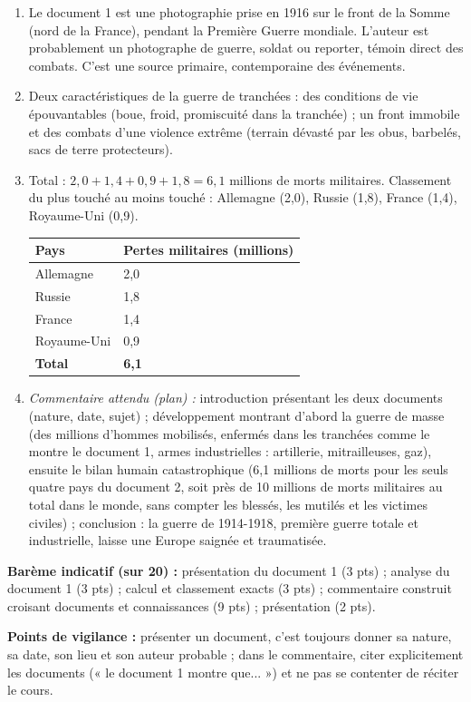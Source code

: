 \documentclass[11pt]{article}
\begin{document}
\begin{corrige}
\begin{enumerate}
\item Le document 1 est une photographie prise en 1916 sur le front de la Somme (nord de la France), pendant la Première Guerre mondiale. L'auteur est probablement un photographe de guerre, soldat ou reporter, témoin direct des combats. C'est une source primaire, contemporaine des événements.
\item Deux caractéristiques de la guerre de tranchées : des conditions de vie épouvantables (boue, froid, promiscuité dans la tranchée) ; un front immobile et des combats d'une violence extrême (terrain dévasté par les obus, barbelés, sacs de terre protecteurs).
\item Total : $2{,}0 + 1{,}4 + 0{,}9 + 1{,}8 = 6{,}1$ millions de morts militaires. Classement du plus touché au moins touché : Allemagne (2,0), Russie (1,8), France (1,4), Royaume-Uni (0,9).

\begin{center}
\begin{tabularx}{\linewidth}{|l|X|}\hline
\textbf{Pays} & \textbf{Pertes militaires (millions)} \\ \hline
Allemagne & 2,0 \\ \hline
Russie & 1,8 \\ \hline
France & 1,4 \\ \hline
Royaume-Uni & 0,9 \\ \hline
\textbf{Total} & \textbf{6,1} \\ \hline
\end{tabularx}
\end{center}

\item \emph{Commentaire attendu (plan) :} introduction présentant les deux documents (nature, date, sujet) ; développement montrant d'abord la guerre de masse (des millions d'hommes mobilisés, enfermés dans les tranchées comme le montre le document 1, armes industrielles : artillerie, mitrailleuses, gaz), ensuite le bilan humain catastrophique (6,1 millions de morts pour les seuls quatre pays du document 2, soit près de 10 millions de morts militaires au total dans le monde, sans compter les blessés, les mutilés et les victimes civiles) ; conclusion : la guerre de 1914-1918, première guerre totale et industrielle, laisse une Europe saignée et traumatisée.
\end{enumerate}
\textbf{Barème indicatif (sur 20) :} présentation du document 1 (3 pts) ; analyse du document 1 (3 pts) ; calcul et classement exacts (3 pts) ; commentaire construit croisant documents et connaissances (9 pts) ; présentation (2 pts).

\textbf{Points de vigilance :} présenter un document, c'est toujours donner sa nature, sa date, son lieu et son auteur probable ; dans le commentaire, citer explicitement les documents (« le document 1 montre que... ») et ne pas se contenter de réciter le cours.
\end{corrige}
\end{document}

